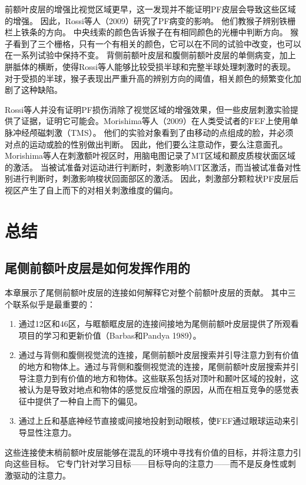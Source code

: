 前额叶皮层的增强比视觉区域更早，这一发现并不能证明PF皮层会导致这些区域的增强。
因此，Rossi等人（2009）研究了PF病变的影响。
他们教猴子辨别铁栅栏上铁条的方向。
中央线索的颜色告诉猴子在有相同颜色的光栅中判断方向。
猴子看到了三个栅格，只有一个有相关的颜色，它可以在不同的试验中改变，也可以在一系列试验中保持不变。
背侧前额叶皮层和腹侧前额叶皮层的单侧病变，加上胼胝体的横断，使得Rossi等人能够比较受损半球和完整半球处理刺激时的表现。
对于受损的半球，猴子表现出严重升高的辨别方向的阈值，相关颜色的频繁变化加剧了这种缺陷。


Rossi等人并没有证明PF损伤消除了视觉区域的增强效果，但一些皮层刺激实验提供了证据，证明它可能会。Morishima等人（2009）在人类受试者的FEF上使用单脉冲经颅磁刺激（TMS）。
他们的实验对象看到了由移动的点组成的脸，并必须对点的运动或脸的性别做出判断。
因此，他们要么注意动作，要么注意面孔。
Morishima等人在刺激额叶视区时，用脑电图记录了MT区域和颞皮质梭状面区域的激活。
当被试准备对运动进行判断时，刺激影响MT区激活，而当被试准备对性别进行判断时，刺激影响梭状回面部区的激活。
因此，刺激部分颗粒状PF皮层后视区产生了自上而下的对相关刺激维度的偏向。



\section{总结}

\subsection{尾侧前额叶皮层是如何发挥作用的}

本章展示了尾侧前额叶皮层的连接如何解释它对整个前额叶皮层的贡献。
其中三个联系似乎是最重要的：

\begin{enumerate}
	\item 通过12区和46区，与眶额眶皮层的连接间接地为尾侧前额叶皮层提供了所观看项目的学习和更新价值（Barbas和Pandya 1989）。
	\item 通过与背侧和腹侧视觉流的连接，尾侧前额叶皮层搜索并引导注意力到有价值的地方和物体上。通过与背侧和腹侧视觉流的连接，尾侧前额叶皮层搜索并引导注意力到有价值的地方和物体。这些联系包括对顶叶和颞叶区域的投射，这被认为是导致对地点和物体的感觉反应增强的原因，从而在相互竞争的感觉表征中提供了一种自上而下的偏见。
	\item 通过上丘和基底神经节直接或间接地投射到动眼核，使FEF通过眼球运动来引导显性注意力。
\end{enumerate}

这些连接使末梢前额叶皮层能够在混乱的环境中寻找有价值的目标，并将注意力引向这些目标。
它专门针对学习目标——目标导向的注意力——而不是反身性或刺激驱动的注意力。



